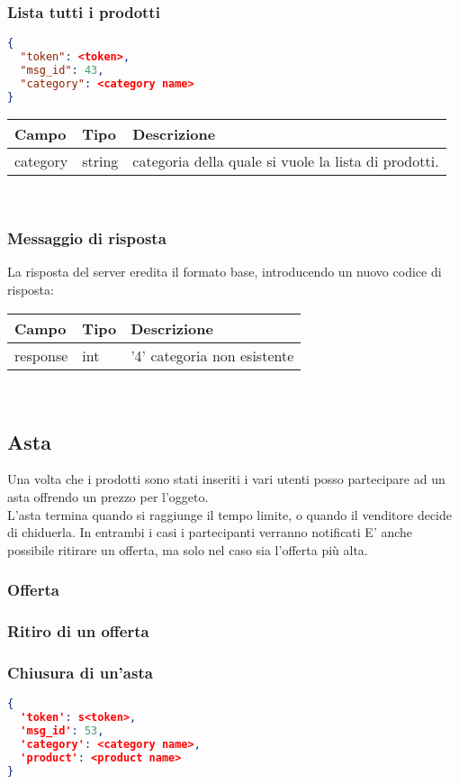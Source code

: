 \subsubsection{Lista tutti i prodotti}
\begin{lstlisting}[language=json]
{
  "token": <token>,
  "msg_id": 43,
  "category": <category name>
}
\end{lstlisting}

\begin{tabular}{|l | l | l |}
\hline
Campo & Tipo & Descrizione \\ \hline
category & string & categoria  della quale si vuole la lista di prodotti. \\ \hline
\end{tabular} \\
\subsubsection{Messaggio di risposta}
La risposta del server eredita il formato base, introducendo un nuovo codice di risposta:\\
\begin{tabular}{|l | l | l |}
\hline
Campo & Tipo & Descrizione \\ \hline
response & int & '4' categoria non esistente \\ \hline
\end{tabular} \\


\subsection{Asta}
Una volta che i prodotti sono stati inseriti i vari utenti posso partecipare ad un asta offrendo un prezzo per l'oggeto.\\
L'asta termina quando si raggiunge il tempo limite, o quando il venditore decide di chiduerla. In entrambi i casi i partecipanti verranno notificati
E' anche possibile ritirare un offerta, ma solo nel caso sia l'offerta più alta.
\subsubsection{Offerta}
\subsubsection{Ritiro di un offerta}
\subsubsection{Chiusura di un'asta}
\begin{lstlisting}[language=json]
{
  'token': s<token>,
  'msg_id': 53,
  'category': <category name>,
  'product': <product name>
}
\end{lstlisting}
